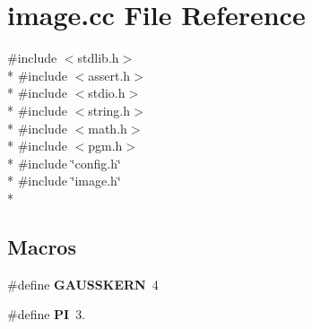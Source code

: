 \section{image.\+cc File Reference}
\label{image_8cc}
{\ttfamily \#include $<$stdlib.\+h$>$}\\*
{\ttfamily \#include $<$assert.\+h$>$}\\*
{\ttfamily \#include $<$stdio.\+h$>$}\\*
{\ttfamily \#include $<$string.\+h$>$}\\*
{\ttfamily \#include $<$math.\+h$>$}\\*
{\ttfamily \#include $<$pgm.\+h$>$}\\*
{\ttfamily \#include \char`\"{}config.\+h\char`\"{}}\\*
{\ttfamily \#include \char`\"{}image.\+h\char`\"{}}\\*
\subsection*{Macros}
\begin{DoxyCompactItemize}
\item 
\#define {\bf G\+A\+U\+S\+S\+K\+E\+RN}~4
\item 
\#define {\bf PI}~3.
\end{DoxyCompactItemize}
